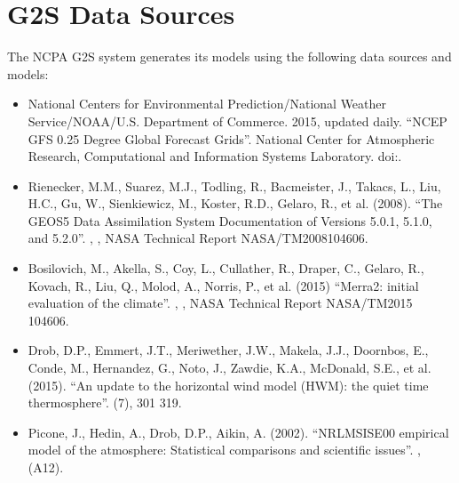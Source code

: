 \documentclass[letterpaper,10pt,english]{sphinxmanual}
\begin{document}
\section{G2S Data Sources}
\label{\detokenize{authorship:g2s-data-sources}}
\sphinxAtStartPar
The NCPA G2S system generates its models using the following data sources and models:
\begin{itemize}
\item {} 
\sphinxAtStartPar
National Centers for Environmental Prediction/National Weather Service/NOAA/U.S. Department of Commerce. 2015, updated daily. “NCEP GFS 0.25 Degree Global Forecast Grids”. National Center for Atmospheric Research, Computational and Information Systems Laboratory. doi:.

\item {} 
\sphinxAtStartPar
Rienecker, M.M., Suarez, M.J., Todling, R., Bacmeister, J., Takacs, L., Liu, H.\sphinxhyphen{}C., Gu, W., Sienkiewicz, M., Koster, R.D., Gelaro, R., et al. (2008).  “The GEOS\sphinxhyphen{}5 Data Assimilation System \textendash{} Documentation of Versions 5.0.1, 5.1.0, and 5.2.0”. , , NASA Technical Report NASA/TM\sphinxhyphen{}2008\sphinxhyphen{}104606.

\item {} 
\sphinxAtStartPar
Bosilovich, M., Akella, S., Coy, L., Cullather, R., Draper, C., Gelaro, R., Kovach, R., Liu, Q., Molod, A., Norris, P., et al. (2015) “Merra\sphinxhyphen{}2: initial evaluation of the climate”. , , NASA Technical Report NASA/TM\sphinxhyphen{}2015 104606.

\item {} 
\sphinxAtStartPar
Drob, D.P., Emmert, J.T., Meriwether, J.W., Makela, J.J., Doornbos, E., Conde, M., Hernandez, G., Noto, J., Zawdie, K.A., McDonald, S.E., et al. (2015).  “An update to the horizontal wind model (HWM): the quiet time thermosphere”.   (7), 301 \textendash{} 319.

\item {} 
\sphinxAtStartPar
Picone, J., Hedin, A., Drob, D.P., Aikin, A. (2002). “NRLMSISE\sphinxhyphen{}00 empirical model of the atmosphere: Statistical comparisons and scientific issues”. ,  (A12).

\end{itemize}



\renewcommand{\indexname}{Index}
\printindex
\end{document}
